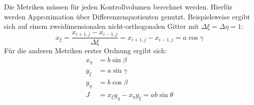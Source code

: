 Die Metriken müssen für jeden Kontrollvolumen berechnet werden. Hierfür werden Approximation über
Differenzenquotienten genutzt. Beispielsweise ergibt sich auf einem zweidimensionalen nicht-orthogonalen
Gitter mit $\Delta\xi = \Delta \eta = 1$:
\begin{equation}
  x_{\xi} = \frac{x_{i+1, j} - x_{i-1,j}}{\Delta \xi} = x_{i+1, j} - x_{i-1,j} = a \cos \gamma
\end{equation}
Für die anderen Metriken erster Ordnung ergibt sich:
\begin{align*}
  x_{\eta} &= b\sin \beta\\
  y_{\xi} &= a \sin \gamma\\
  y_{\eta} &= b \cos \beta\\
  J &= x_{\xi}y_{\eta}-x_{\eta}y_{\xi} = a b \sin \theta
\end{align*}
